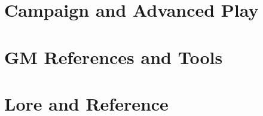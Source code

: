 \documentclass[11pt]{book}
\begin{document}
\part{Campaign and Advanced Play}
\clearpage
\clearpage
\clearpage

\part{GM References and Tools}
\clearpage

\part{Lore and Reference}
\clearpage

\appendix
\clearpage
\clearpage
\clearpage
\clearpage
\clearpage
\clearpage
\clearpage
\clearpage
\clearpage
\clearpage
\clearpage

\backmatter
\printindex
\end{document}
